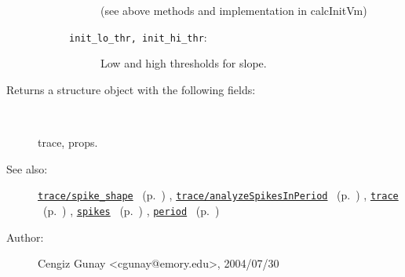 \begin{description}
\begin{description}
\begin{description}
(see above methods and implementation in calcInitVm)
\item[\texttt{init\_lo\_thr, init\_hi\_thr}:]
 Low and high thresholds for slope.
\end{description}%
\end{description}%
%
\item[Returns a structure object with the following fields:
]~

	trace, props.
%
%
\item[See also:]%
\hyperlink{ref_trace__spike_shape}{\texttt{trace/spike\_shape}}%
\ (p.~\pageref{ref_trace__spike_shape})%
%
, \hyperlink{ref_trace__analyzeSpikesInPeriod}{\texttt{trace/analyzeSpikesInPeriod}}%
\ (p.~\pageref{ref_trace__analyzeSpikesInPeriod})%
%
, \hyperlink{ref_trace}{\texttt{trace}}%
\ (p.~\pageref{ref_trace})%
%
, \hyperlink{ref_spikes}{\texttt{spikes}}%
\ (p.~\pageref{ref_spikes})%
%
, \hyperlink{ref_period}{\texttt{period}}%
\ (p.~\pageref{ref_period})%
%
%
\item[Author:]%
Cengiz Gunay <cgunay@emory.edu>, 2004/07/30
%
\end{description}
\methodline%
